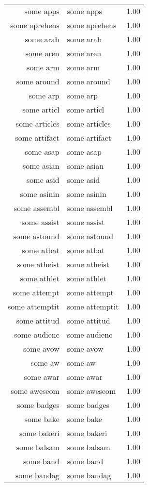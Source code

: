 \begin{table}[ht]
\begin{tabular}{rlr}
  some apps & some apps & 1.00 \\ 
  some aprehens & some aprehens & 1.00 \\ 
  some arab & some arab & 1.00 \\ 
  some aren & some aren & 1.00 \\ 
  some arm & some arm & 1.00 \\ 
  some around & some around & 1.00 \\ 
  some arp & some arp & 1.00 \\ 
  some articl & some articl & 1.00 \\ 
  some articles & some articles & 1.00 \\ 
  some artifact & some artifact & 1.00 \\ 
  some asap & some asap & 1.00 \\ 
  some asian & some asian & 1.00 \\ 
  some asid & some asid & 1.00 \\ 
  some asinin & some asinin & 1.00 \\ 
  some assembl & some assembl & 1.00 \\ 
  some assist & some assist & 1.00 \\ 
  some astound & some astound & 1.00 \\ 
  some atbat & some atbat & 1.00 \\ 
  some atheist & some atheist & 1.00 \\ 
  some athlet & some athlet & 1.00 \\ 
  some attempt & some attempt & 1.00 \\ 
  some attemptit & some attemptit & 1.00 \\ 
  some attitud & some attitud & 1.00 \\ 
  some audienc & some audienc & 1.00 \\ 
  some avow & some avow & 1.00 \\ 
  some aw & some aw & 1.00 \\ 
  some awar & some awar & 1.00 \\ 
  some aweseom & some aweseom & 1.00 \\ 
  some badges & some badges & 1.00 \\ 
  some bake & some bake & 1.00 \\ 
  some bakeri & some bakeri & 1.00 \\ 
  some balsam & some balsam & 1.00 \\ 
  some band & some band & 1.00 \\ 
  some bandag & some bandag & 1.00 \\ 

\end{tabular}
\end{table}
